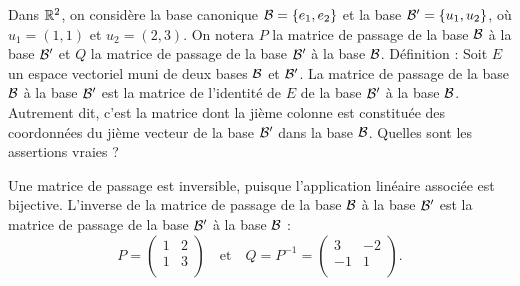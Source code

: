\begin{question}
Dans $\mathbb{R}^2$, on considère la base canonique ${\cal {B}} =\{e_1,e_2\}$ et  la base ${\cal {B}}' =\{u_1,u_2\}$, où 
$u_1=(1,1)$ et $u_2=(2,3)$. On notera $P$ la matrice de passage de la base ${\cal {B}}$ à la base ${\cal {B}}'$ et $Q$ la matrice de passage de la base ${\cal {B}}'$ à la base ${\cal {B}}$.
\vskip0mm
Définition : Soit $E$ un espace vectoriel muni de deux bases ${\cal {B}}$ et ${\cal {B}}'$.
La matrice de passage de la base ${\cal {B}}$ à la base  ${\cal {B}}'$ est la matrice de l'identité de $E$ de la base 
${\cal {B}}'$ à la base  ${\cal {B}}$. Autrement dit, c'est la matrice dont la jième colonne est constituée des coordonnées du jième vecteur de la base ${\cal {B}'}$ dans la base  ${\cal {B}}$.
\vskip2mm
Quelles sont les assertions vraies ?
\begin{answers}  
\end{answers}
\begin{explanations} Une matrice de passage est inversible, puisque l'application linéaire associée est bijective. L'inverse de la matrice de passage de la base ${\cal {B}}$ à la base ${\cal {B}}'$ est la matrice de passage de la base ${\cal {B}}'$ à la base ${\cal {B}}$ :
$$P = \left(\begin{array}{rc}1&2\\
1&3\\ \end{array}\right)\quad \mbox{et}\quad Q = P^{-1}= \left(\begin{array}{rc}
3&-2\\-1&1\\ \end{array}\right).$$
\end{explanations}
\end{question}

